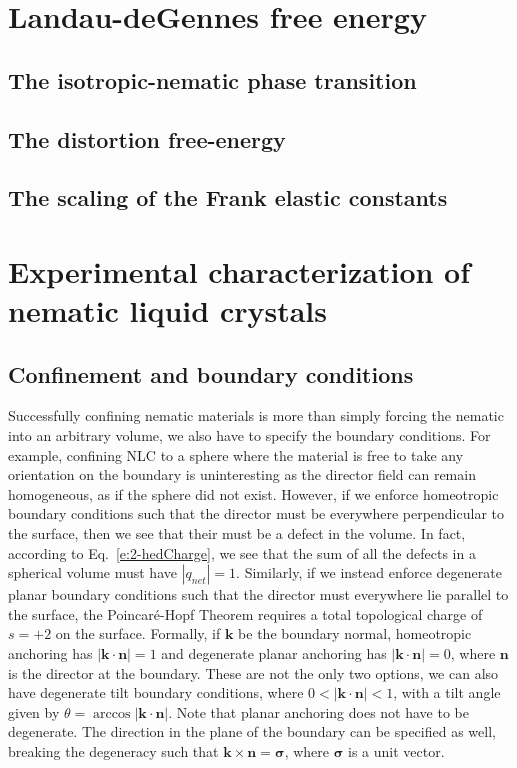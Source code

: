 \section{Landau-deGennes free energy}
\subsection{The isotropic-nematic phase transition}
\subsection{The distortion free-energy}
\subsection{The scaling of the Frank elastic constants}




\section{Experimental characterization of nematic liquid crystals}
\subsection{Confinement and boundary conditions}
Successfully confining nematic materials is more than simply forcing the nematic into an arbitrary volume, we also have to specify the boundary conditions.
For example, confining NLC to a sphere where the material is free to take any orientation on the boundary is uninteresting as the director field can remain homogeneous, as if the sphere did not exist.
However, if we enforce homeotropic boundary conditions such that the director must be everywhere perpendicular to the surface, then we see that their must be a defect in the volume.
In fact, according to Eq.~\ref{e:2-hedCharge}, we see that the sum of all the defects in a spherical volume must have $|q_{net}| = 1$.
Similarly, if we instead enforce degenerate planar boundary conditions such that the director must everywhere lie parallel to the surface, the Poincar\'e-Hopf Theorem requires a total topological charge of $s = +2$ on the surface.
Formally, if $\mathbf{k}$ be the boundary normal, homeotropic anchoring has $|\mathbf{k} \cdot \mathbf{n}| = 1$ and degenerate planar anchoring has $|\mathbf{k} \cdot \mathbf{n}| = 0$, where $\mathbf{n}$ is the director at the boundary.
These are not the only two options, we can also have degenerate tilt boundary conditions, where $0< |\mathbf{k} \cdot \mathbf{n}| < 1$, with a tilt angle given by $\theta = \arccos |\mathbf{k} \cdot \mathbf{n}| $.
Note that planar anchoring does not have to be degenerate.
The direction in the plane of the boundary can be specified as well, breaking the degeneracy such that $\mathbf{k} \times \mathbf{n} = \bm{\sigma}$, where $\bm{\sigma}$ is a unit vector.\\

